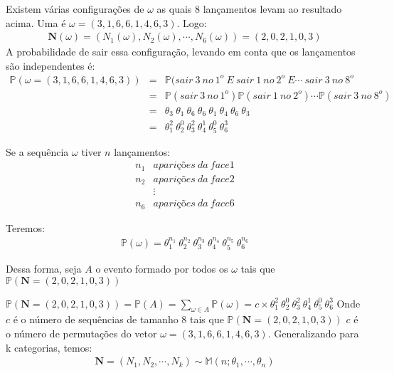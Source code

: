 \documentclass[11pt,a4paper]{book}
\begin{document}
\begin{itemize}
		Existem várias configurações de $\omega$ as quais 8 lançamentos levam ao resultado acima.
		Uma é $\omega=(3,1,6,6,1,4,6,3)$.
		Logo:
		\begin{align*}
			\textbf{N}(\omega)=(N_1(\omega),N_2(\omega),\cdots,N_6(\omega))=(2,0,2,1,0,3)
		\end{align*}
		A probabilidade de sair essa configuração, levando em conta que os lançamentos são independentes é:
		\begin{eqnarray*}
			\mathbb{P}(\omega=(3,1,6,6,1,4,6,3))&=&\mathbb{P}(sair~3~no~1^o~E~sair~1~no~2^o~E\cdots~sair~3~no~8^o\\
			& = &\mathbb{P}(sair~3~no~1^o)\mathbb{P}(sair~1~no~2^o)\cdots\mathbb{P}(sair~3~no~8^o)\\
			& = &\theta_3~\theta_1~\theta_6~\theta_6~\theta_1~\theta_4~\theta_6~\theta_3\\
			& = &\theta_{1}^{2}~\theta_{2}^{0}~\theta_{3}^{2}~\theta_{4}^{1}~\theta_{5}^{0}~\theta_{6}^{3}
		\end{eqnarray*}
		
		Se a sequência $\omega$ tiver $n$ lançamentos:
		\begin{eqnarray*}
			n_1 & aparições~da~face 1\\
			n_2 & aparições~da~face 2\\
			&\vdots\\
			n_6 & aparições~da~face 6
		\end{eqnarray*}
		
		Teremos:
		\begin{eqnarray*}
			\mathbb{P}(\omega)=\theta_{1}^{n_1}~\theta_{2}^{n_2}~\theta_{3}^{n_3}~\theta_{4}^{n_4}~\theta_{5}^{n_5}~\theta_{6}^{n_6}
		\end{eqnarray*}
		
		Dessa forma, seja $A$ o evento formado por todos os $\omega$ tais que $\mathbb{P}(\textbf{N}=(2,0,2,1,0,3))$
		
		$\mathbb{P}(\textbf{N}=(2,0,2,1,0,3))=\mathbb{P}(A)=\sum_{\omega\in A}\mathbb{P}(\omega)=c\times\theta_{1}^{2}~\theta_{2}^{0}~\theta_{3}^{2}~\theta_{4}^{1}~\theta_{5}^{0}~\theta_{6}^{3}$
		Onde $c$ é o número de sequências de tamanho 8 tais que $\mathbb{P}(\textbf{N}=(2,0,2,1,0,3))$
		$c$ é o número de permutações do vetor $\omega=(3,1,6,6,1,4,6,3)$.
		Generalizando para k categorias, temos:
		\begin{eqnarray*}
			\textbf{N}=(N_1,N_2,\cdots,N_k)\sim\mathbb{M}(n;\theta_1,\cdots,\theta_n)
		\end{eqnarray*}
		

\end{itemize}
\end{document}
